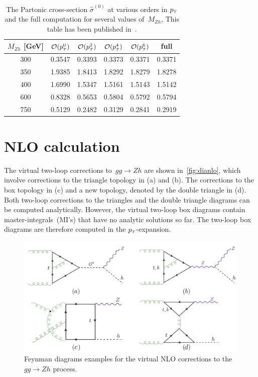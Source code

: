 \begin{table}
	\renewcommand{\arraystretch}{1.2}
	\centering
	\begin{tabular}{| c| c | c | c| c| c|} \hline
		\rowcolor{lightgray}  $M_{Zh}$ [GeV]  & $\mathcal{O}(p_{\scriptscriptstyle T}^0)$ & $\mathcal{O}(p_{\scriptscriptstyle T}^2)$ & $\mathcal{O}(p_{\scriptscriptstyle T}^4)$ & $\mathcal{O}(p_{\scriptscriptstyle T}^6)$ & full \\ \hline 
		\cellcolor{lightgray} 300 & 0.3547 & 0.3393 &  0.3373 &0.3371& 0.3371 \\
		\cellcolor{lightgray} 350 & 1.9385 & 1.8413& 1.8292 &1.8279& 1.8278 \\
		\cellcolor{lightgray} 400 & 1.6990 & 1.5347 & 1.5161 &1.5143& 1.5142 \\
		\cellcolor{lightgray} 600 & 0.8328 & 0.5653 & 0.5804 &0.5792&  0.5794 \\ 
		\cellcolor{lightgray} 750 & 0.5129 & 0.2482 & 0.3129 & 0.2841 &  0.2919 \\ \hline
	\end{tabular}
	\caption{The Partonic cross-section $\hat{\sigma}^{(0)}$ at
		various orders in $p_{\scriptscriptstyle T}$ and the full computation for several values of~$M_{Zh}$, This table has been published in~\cite{Alasfar:2021ppe}. \label{tab:partonic}}
\end{table}
\section{ NLO calculation }
\label{sec:quattro}
The virtual two-loop corrections to~$ gg\to Zh$ are shown in~\autoref{fig:dianlo}, which involve corrections to the triangle topology in (a) and (b). The corrections to the box topology in (c) and a new topology, denoted by the double triangle in (d). Both two-loop corrections to the triangles and the double triangle diagrams can be computed analytically. However, the virtual two-loop box diagrams contain master-integrals~(MI's) that have no analytic solutions so far. The two-loop box diagrams are therefore computed in the $p_{\scriptscriptstyle T}$-expansion.
\begin{figure}[htpb!]
	\begin{center}
		\includegraphics[width=12cm]{./figures/Feynman_NL0}
		\caption{Feynman diagrams examples for the virtual NLO corrections to the $gg \to Zh$ process. }
		\label{fig:dianlo}
	\end{center}
\end{figure}
